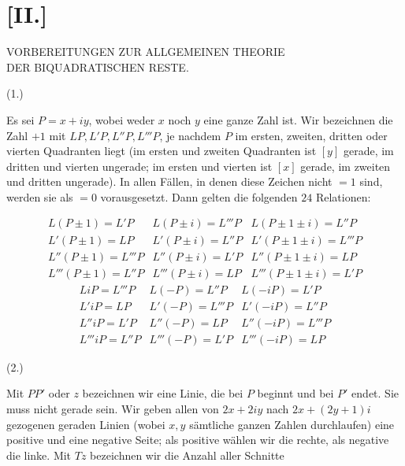
\section*{[II.]}
\begin{center}VORBEREITUNGEN ZUR ALLGEMEINEN THEORIE\\DER BIQUADRATISCHEN RESTE.\end{center}
\par\medskip{}\centerline{(1.)}\smallskip
Es sei $P=x+iy$, wobei weder $x$ noch $y$ eine ganze Zahl ist. Wir bezeichnen die Zahl $+1$ mit $LP,L'P,L''P,L'''P$, je nachdem $P$ im ersten, zweiten, dritten oder vierten Quadranten liegt (im ersten und zweiten Quadranten ist $[y]$ gerade, im dritten und vierten ungerade; im ersten und vierten ist $[x]$ gerade, im zweiten und dritten ungerade). In allen Fällen, in denen diese Zeichen nicht $=1$ sind, werden sie als $=0$ vorausgesetzt. Dann gelten die folgenden $24$ Relationen:

\[
\begin{array}{lll}
L(P\pm1)=L'P&L(P\pm i)=L'''P&L(P\pm1\pm i)=L''P\\
L'(P\pm1)=LP&L'(P\pm i)=L''P&L'(P\pm1\pm i)=L'''P\\
L''(P\pm1)=L'''P&L''(P\pm i)=L'P&L''(P\pm1\pm i)=LP\\
L'''(P\pm1)=L''P&L'''(P\pm i)=LP&L'''(P\pm1\pm i)=L'P
\end{array}
\]
\[
\begin{array}{lll}
LiP=L'''P&L(-P)=L''P&L(-iP)=L'P\\
L'iP=LP&L'(-P)=L'''P&L'(-iP)=L''P\\
L''iP=L'P&L''(-P)=LP&L''(-iP)=L'''P\\
L'''iP=L''P&L'''(-P)=L'P&L'''(-iP)=LP
\end{array}
\]

\par\medskip{}\centerline{(2.)}\smallskip
Mit $PP'$ oder $z$ bezeichnen wir eine Linie, die bei $P$ beginnt und bei $P'$ endet. Sie muss nicht gerade sein. Wir geben allen von $2x+2iy$ nach $2x+(2y+1)i$ gezogenen geraden Linien (wobei $x,y$ sämtliche ganzen Zahlen durchlaufen) eine positive und eine negative Seite; als positive wählen wir die rechte, als negative die linke. Mit $Tz$ bezeichnen wir die Anzahl aller Schnitte

